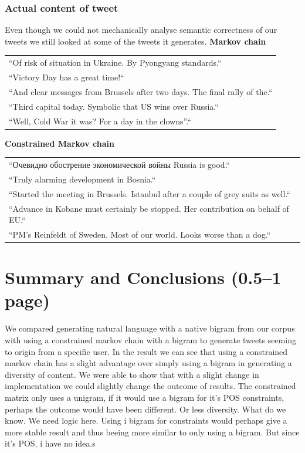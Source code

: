 \documentclass[a4paper,12pt]{article}
\begin{document}
\subsubsection{Actual content of tweet}
Even though we could not mechanically analyse semantic correctness of our tweets we still looked at some of the tweets it generates.
\textbf{Markov chain}
\begin{tabular}{l}
``Of risk of situation in Ukraine. By Pyongyang standards.``\\
``Victory Day has a great time!\hspace{0 cm}``\\
``And clear messages from Brussels after two days. The final rally of the.``\\
``Third capital today. Symbolic that US wins over Russia.``\\
``Well, Cold War it was? For a day in the clowns''.``
\end{tabular}
\textbf{Constrained Markov chain}
\begin{tabular}{l}
``Очевидно обострение экономической войны Russia is good.``\\
``Truly alarming development in Bosnia.``\\ %
``Started the meeting in Brussels. Istanbul after a couple of grey suits as well.``\\
``Advance in Kobane must certainly be stopped. Her contribution on behalf of EU.``\\
``PM's Reinfeldt of Sweden. Most of our world. Looks worse than a dog.``
\end{tabular}
\newpage
\section{Summary and Conclusions (0.5--1 page)}
\label{sec:summary}
We compared generating natural language with a native bigram from our corpus with using a constrained markov chain with a bigram to generate tweets seeming to origin from a specific user.
In the result we can see that using a constrained markov chain has a slight advantage over simply using a bigram in generating a diversity of content. %
We were able to show that with a slight change in implementation we could slightly change the outcome of results.
The constrained matrix only uses a unigram, if it would use a bigram for it's POS constraints, perhaps the outcome would have been different. Or less diversity. What do we know. We need logic here.
Using i bigram for constraints would perhaps give a more stable result and thus beeing more similar to only using a bigram. But since it's POS, i have no idea.s


\end{document}
